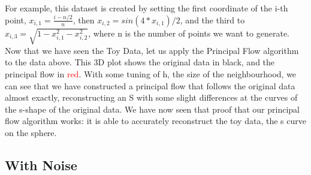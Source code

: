 \documentclass[12pt]{report}
\begin{document}
\newpage

For example, this dataset is created by setting the first coordinate of the 
i-th point, $x_{i, 1} = \frac{i-n/2}{n}$, then $x_{i, 2} = sin(4*x_{i, 1})/2$, 
and the third to $x_{i, 3} = \sqrt{1-x_{i, 1}^2 - x_{i, 2}^2}$, 
where n is the number of points we want to generate.\\
Now that we have seen the Toy Data, let us apply the Principal Flow 
algorithm to the data above.
This 3D plot shows the original data in black, and the principal flow in 
\textcolor{red}{red}.
With some tuning of h, the size of the neighbourhood, we can see that we have constructed
a principal flow that follows the original data almost
exactly, reconstructing an S with some slight differences at the curves of the s-shape of
the original data.
We have now seen that proof that our principal flow algorithm works:
it is able to accurately reconstruct the toy data, 
the s curve on the sphere.

\subsection{With Noise}
\end{document}
